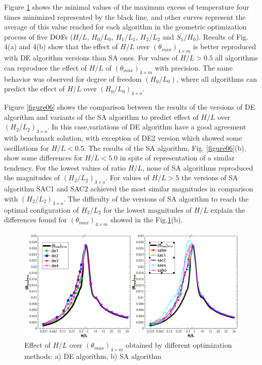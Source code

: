 \documentclass[12pt,fleqn]{article}
\begin{document}
Figure \ref{figure04} shows  the minimal values of the maximum excess of temperature four times minimized represented by the black line, and other curves represent the average of this value reached for each algorithm in the geometric optimization process of five DOFs ($H/L$, $H_{0}/L_{0}$, $H_{1}/L_{1}$, $H_{2}/L_{2}$ and $S_{1}/H_{0}$). Results of Fig. 4(a) and 4(b) show that the effect of $H/L$ over $({\theta}_{max})_{4\times m}$ is better reproduced with DE algorithm versions than SA ones. For values of $H/L > 0.5$ all algorithms can reproduce the effect of $H/L$ of $({\theta}_{max})_{4\times m}$ with precision. The same behavior was observed for degree of freedom $(H_{0}/L_{0})$, where all algorithms can predict the effect of $H/L$ over ${(H_{0}/L_{0})_{4\times o}}$.



Figure \ref{figure06} shows the comparison between the results of the versions of DE algorithm and variants of the SA algorithm to predict effect of $H/L$ over ${(H_{2}/L_{2})_{3\times o}}$. In this case,variations of DE algorithm have a good agreement with benchmark solution, with exception of DE2 version which showed some oscillations for $H/L< 0.5$. The results of the SA algorithm, Fig. \ref{figure06}(b), show some differences for $H/L < 5.0$ in spite of representation of a similar tendency. For the lowest values of ratio $H/L$, none of SA algorithms reproduced the magnitudes of ${(H_{2}/L_{2})_{3\times o}}$. For values of $H/L > 5$ the versions of SA algorithm SAC1 and SAC2 achieved the most similar magnitudes in comparison with ${(H_{2}/L_{2})_{3\times o}}$. The difficulty of the versions of SA algorithm to reach the optimal configuration of $H_{2}/L_{2}$ for the lowest magnitudes of $H/L$ explain the differences found for $({\theta}_{max})_{4\times m}$ showed in the Fig.\ref{figure04}(b).

\begin{figure}[H]
\centering
\includegraphics[width=0.9\linewidth]{imgs/5dof/de_sa_hl_tmin.png}
\caption{ {\small Effect of $H/L$ over $({\theta}_{max})_{4\times m}$ obtained by different optimization methods: a) DE algorithm, b) SA algorithm}}
\label{figure04}
\end{figure}
\end{document}
